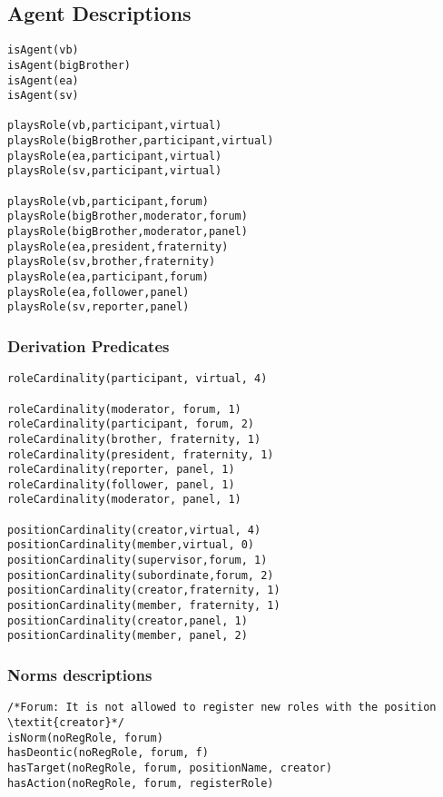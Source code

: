 \subsection*{Agent Descriptions }
\begin{verbatim}
isAgent(vb)
isAgent(bigBrother)
isAgent(ea)
isAgent(sv)

playsRole(vb,participant,virtual)
playsRole(bigBrother,participant,virtual)
playsRole(ea,participant,virtual)
playsRole(sv,participant,virtual)

playsRole(vb,participant,forum)
playsRole(bigBrother,moderator,forum)
playsRole(bigBrother,moderator,panel)
playsRole(ea,president,fraternity)
playsRole(sv,brother,fraternity)
playsRole(ea,participant,forum)
playsRole(ea,follower,panel)
playsRole(sv,reporter,panel)

\end{verbatim}


\subsubsection*{Derivation Predicates}
\begin{verbatim}
roleCardinality(participant, virtual, 4)

roleCardinality(moderator, forum, 1)
roleCardinality(participant, forum, 2)
roleCardinality(brother, fraternity, 1)
roleCardinality(president, fraternity, 1)
roleCardinality(reporter, panel, 1)
roleCardinality(follower, panel, 1)
roleCardinality(moderator, panel, 1)

positionCardinality(creator,virtual, 4)
positionCardinality(member,virtual, 0)
positionCardinality(supervisor,forum, 1)
positionCardinality(subordinate,forum, 2)
positionCardinality(creator,fraternity, 1)
positionCardinality(member, fraternity, 1)
positionCardinality(creator,panel, 1)
positionCardinality(member, panel, 2)

\end{verbatim}

\subsubsection*{Norms descriptions}


\begin{verbatim}
/*Forum: It is not allowed to register new roles with the position \textit{creator}*/
isNorm(noRegRole, forum)
hasDeontic(noRegRole, forum, f)
hasTarget(noRegRole, forum, positionName, creator)
hasAction(noRegRole, forum, registerRole)
\end{verbatim}

